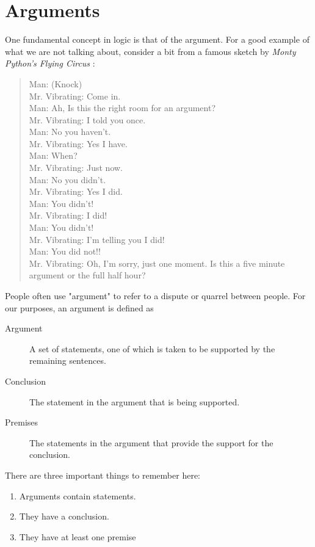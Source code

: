 \documentclass[../logic-text.tex]{subfiles}
\begin{document}
\section{Arguments}
\label{sec:arguments}

One fundamental concept in logic is that of the argument. For a good example of what we are not talking about, consider a bit from a famous sketch by \emph{Monty Python's Flying Circus} \autocite{Cleese:1980aa}:

\begin{quote}
Man: (Knock)\\
Mr. Vibrating: Come in.\\
Man: Ah, Is this the right room for an argument?\\
Mr. Vibrating: I told you once.\\
Man: No you haven't.\\
Mr. Vibrating: Yes I have.\\
Man: When?\\
Mr. Vibrating: Just now.\\
Man: No you didn't.\\
Mr. Vibrating: Yes I did.\\
Man: You didn't!\\
Mr. Vibrating: I did!\\
Man: You didn't!\\
Mr. Vibrating: I'm telling you I did!\\
Man: You did not!!\\
Mr. Vibrating: Oh, I'm sorry, just one moment. Is this a five minute argument or the full half hour?\\
\end{quote}

People often use "argument" to refer to a dispute or quarrel between people.
For our purposes, an argument is defined as

\begin{description}
\item[Argument] A set of statements, one of which is taken to be supported by the remaining sentences.
\item[Conclusion] The statement in the argument that is being supported.
\item[Premises] The statements in the argument that provide the support for the conclusion.
\end{description}

There are three important things to remember here:

\begin{enumerate}
\item Arguments contain statements.
\item They have a conclusion.
\item They have at least one premise
\end{enumerate}
\end{document}
